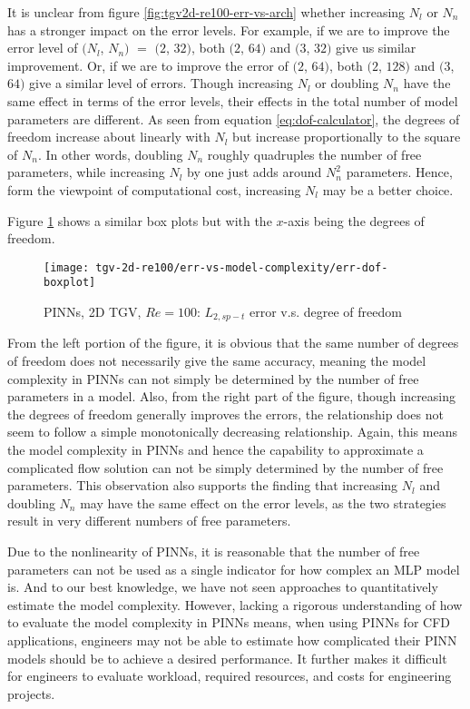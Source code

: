 It is unclear from figure \ref{fig:tgv2d-re100-err-vs-arch} whether increasing $N_l$ or $N_n$ has a stronger impact on the error levels.
For example, if we are to improve the error level of $(N_l$, $N_n)$ $=$ $(2$, $32)$, both $(2$, $64)$ and $(3$, $32)$ give us similar improvement.
Or, if we are to improve the error of $(2$, $64)$, both $(2$, $128)$ and $(3$, $64)$ give a similar level of errors.
Though increasing $N_l$ or doubling $N_n$ have the same effect in terms of the error levels, their effects in the total number of model parameters are different. 
As seen from equation \eqref{eq:dof-calculator}, the degrees of freedom increase about linearly with $N_l$ but increase proportionally to the square of $N_n$.
In other words, doubling $N_n$ roughly quadruples the number of free parameters, while increasing $N_l$ by one just adds around $N_n^2$ parameters.
Hence, form the viewpoint of computational cost, increasing $N_l$ may be a better choice.

Figure \ref{fig:tgv2d-re100-err-vs-dof} shows a similar box plots but with the $x$-axis being the degrees of freedom.
\begin{figure}[hbt!]
    \centering%
    \texttt{[image: tgv-2d-re100/err-vs-model-complexity/err-dof-boxplot]}
    \caption[%
        PINNs, 2D TGV, $Re=100$: $L_{2,sp-t}$ error v.s. degree of freedom%
    ]{%
        PINNs, 2D TGV, $Re=100$: $L_{2,sp-t}$ error v.s. degree of freedom%
    }
    \label{fig:tgv2d-re100-err-vs-dof}
\end{figure}
From the left portion of the figure, it is obvious that the same number of degrees of freedom does not necessarily give the same accuracy, meaning the model complexity in PINNs can not simply be determined by the number of free parameters in a model.
Also, from the right part of the figure, though increasing the degrees of freedom generally improves the errors, the relationship does not seem to follow a simple monotonically decreasing relationship.
Again, this means the model complexity in PINNs and hence the capability to approximate a complicated flow solution can not be simply determined by the number of free parameters.
This observation also supports the finding that increasing $N_l$ and doubling $N_n$ may have the same effect on the error levels, as the two strategies result in very different numbers of free parameters.

Due to the nonlinearity of PINNs, it is reasonable that the number of free parameters can not be used as a single indicator for how complex an MLP model is.
And to our best knowledge, we have not seen approaches to quantitatively estimate the model complexity.
However, lacking a rigorous understanding of how to evaluate the model complexity in PINNs means, when using PINNs for CFD applications, engineers may not be able to estimate how complicated their PINN models should be to achieve a desired performance.
It further makes it difficult for engineers to evaluate workload, required resources, and costs for engineering projects.

